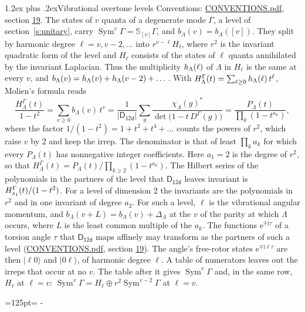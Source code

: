 \documentclass[10pt,a4paper]{article}
\makeatletter
\renewcommand\section{\@startsection{section}{1}{\z@}{-3ex plus -1ex minus -.2ex}%
  {1.2ex plus .2ex}{\normalfont\large\sffamily\bfseries\color{parttitle}}}
\newcommand{\needspace}[1]{\par\penalty-100\begingroup\dimen0=#1\relax\dimen2=\pagegoal
  \advance\dimen2-\pagetotal\ifdim\dimen0>\dimen2\relax\ifdim\dimen2>0pt\vfil\break\fi\fi
  \endgroup}
\numberwithin{equation}{section}
\newcommand{\grp}[1]{\mathsf{#1}}
\newcommand{\irr}[1]{\text{\normalfont\scshape #1}}
\newcommand{\iunit}{\mathrm{i}}
\newcommand{\expe}{\mathrm{e}}
\newcommand{\repD}[1]{D^{#1}}
\newcommand{\irchar}[1]{\chi_{#1}}
\newcommand{\conj}[1]{{#1}^{*}}
\newcommand{\schur}[1]{\mathbb{S}_{#1}}
\newcommand{\shape}[1]{[#1]}
\newcommand{\occ}[1]{\lvert #1\rangle}
\makeatother
\begin{document}
\section{Vibrational overtone levels}\label{s:overtones}
Conventions: \href{../../CONVENTIONS.pdf}{CONVENTIONS.pdf}, section \href{../../CONVENTIONS.pdf\#conv.19}{19}.
\leavevmode\label{n:index.quanta}\label{n:operator.symmetric.power}The states of $v$ quanta of a degenerate mode $\Gamma$, a level of section~\ref{s:unitary}, carry $\operatorname{Sym}^{v}\Gamma = \schur{\shape{v}}\Gamma$, and $b_\Lambda(v) = b_\Lambda(\shape{v})$. \label{n:local.quadratic.form}\label{n:set.harmonic}They split by harmonic degree $\ell = v, v - 2, \dots$ into $r^{v-\ell}H_\ell$, where $r^2$ is the invariant quadratic form of the level and $H_\ell$ consists of the states of $\ell$ quanta annihilated by the invariant Laplacian. \label{n:function.multiplicity.harmonic}Thus the multiplicity $\mathnormal{h}_\Lambda(\ell)$ of $\Lambda$ in $H_\ell$ is the same at every $v$, and $b_\Lambda(v) = \mathnormal{h}_\Lambda(v) + \mathnormal{h}_\Lambda(v - 2) + \dots$. \label{n:function.generating.level}With $H^{\Gamma}_\Lambda(t) = \sum_{\ell\ge0} \mathnormal{h}_\Lambda(\ell)\,t^{\ell}$, Molien's formula reads
\begin{equation}\label{e:molien}\frac{H^{\Gamma}_\Lambda(t)}{1 - t^2} = \sum_{v\ge0} b_\Lambda(v)\,t^v = \frac{1}{|\grp{D_{12d}}|}\sum_{g}\frac{\conj{\irchar{\Lambda}(g)}}{\det\bigl(1 - t\,\repD{\Gamma}(g)\bigr)} = \frac{P_\Lambda(t)}{\prod_k (1-t^{a_k})},\end{equation}
where the factor $1/(1 - t^2) = 1 + t^2 + t^4 + \dots$ counts the powers of $r^2$, which raise $v$ by 2 and keep the irrep. The denominator is that of least $\prod_k a_k$ for which every $P_\Lambda(t)$ has nonnegative integer coefficients. Here $a_1 = 2$ is the degree of $r^2$, so that $H^{\Gamma}_\Lambda(t) = P_\Lambda(t)/\prod_{k\ge2}(1 - t^{a_k})$. The Hilbert series of the polynomials in the partners of the level that $\grp{D_{12d}}$ leaves invariant is $H^{\Gamma}_{\irr{a}_{1}}(t)/(1 - t^2)$. For a level of dimension 2 the invariants are the polynomials in $r^2$ and in one invariant of degree $a_2$. \label{n:index.overtone.period}\label{n:index.increment.unitary}For such a level, $\ell$ is the vibrational angular momentum, and $b_\Lambda(v + L) = b_\Lambda(v) + \Delta_\Lambda$ at the $v$ of the parity at which $\Lambda$ occurs, where $L$ is the least common multiple of the $a_k$. \label{n:local.torsion.angle}The functions $\expe^{\mp\iunit\tau}$ of a torsion angle $\tau$ that $\grp{D_{12d}}$ maps affinely may transform as the partners of such a level (\href{../../CONVENTIONS.pdf}{CONVENTIONS.pdf}, section \href{../../CONVENTIONS.pdf\#conv.19}{19}). The angle's free-rotor states $\expe^{\mp\iunit\ell\tau}$ are then $\occ{\ell 0}$ and $\occ{0 \ell}$, of harmonic degree $\ell$. A table of numerators leaves out the irreps that occur at no $v$. The table after it gives $\operatorname{Sym}^{v}\Gamma$ and, in the same row, $H_\ell$ at $\ell = v$: $\operatorname{Sym}^{v}\Gamma = H_\ell \oplus r^2\operatorname{Sym}^{v-2}\Gamma$ at $\ell = v$.
\needspace{125pt}
\end{document}
